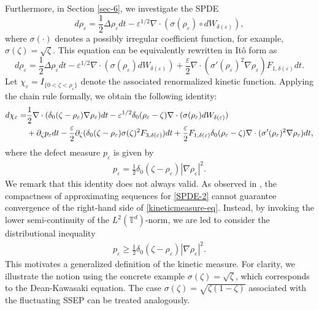 \documentclass[UTF-8,reqno]{amsart}
\numberwithin{equation}{section}
\def\geq{\geqslant}
\def\geq{\geqslant}
\begin{document}
Furthermore, in Section \ref{sec-6}, we investigate the SPDE 
\begin{equation}\label{SPDE-2}
d\rho_{\varepsilon}=\frac{1}{2}\Delta\rho_{\varepsilon}dt-\varepsilon^{1/2}\nabla\cdot(\sigma(\rho_{\varepsilon})\circ dW_{\delta(\varepsilon)}), 	
\end{equation}
where $\sigma(\cdot)$ denotes a possibly irregular coefficient function, for example, $\sigma(\zeta)=\sqrt{\zeta}$. This equation can be equivalently rewritten in It\^o form as
\begin{equation}\label{SPDE-irregular}
d\rho_{\varepsilon}=\frac{1}{2}\Delta\rho_{\varepsilon}dt-\varepsilon^{1/2}\nabla\cdot(\sigma(\rho_{\varepsilon}) dW_{\delta(\varepsilon)})+\frac{\varepsilon}{2}\nabla\cdot(\sigma'(\rho_{\varepsilon})^2\nabla\rho_{\varepsilon})F_{1,\delta(\varepsilon)}dt. 	
\end{equation}
Let $\chi_{\varepsilon}=I_{\{0<\zeta<\rho_{\varepsilon}\}}$ denote the associated renormalized kinetic function. Applying the chain rule formally, we obtain the following identity:
\begin{align}\label{kinetic-formula}
d\chi_{\varepsilon}=&\frac{1}{2}\nabla\cdot(\delta_0(\zeta-\rho_{\varepsilon})\nabla\rho_{\varepsilon})dt-\varepsilon^{1/2}\delta_0(\rho_{\varepsilon}-\zeta)\nabla\cdot(\sigma(\rho_{\varepsilon})dW_{\delta(\varepsilon)})\notag\\
&+\partial_{\zeta}p_{\varepsilon}dt-\frac{\varepsilon}{2}\partial_{\zeta}(\delta_0(\zeta-\rho_{\varepsilon})\sigma(\zeta)^2F_{3,\delta(\varepsilon)})dt+\frac{\varepsilon}{2}F_{1,\delta(\varepsilon)}\delta_0(\rho_{\varepsilon}-\zeta)\nabla\cdot(\sigma'(\rho_{\varepsilon})^2\nabla\rho_{\varepsilon})dt, 	
\end{align}
where the defect measure $p_{\varepsilon}$ is given by
\begin{align}\label{kineticmeasure-eq}
p_{\varepsilon}=\frac{1}{2}\delta_0(\zeta-\rho_{\varepsilon})|\nabla\rho_{\varepsilon}|^2.  	
\end{align}
We remark that this identity does not always valid. As observed in \cite{FG24}, the compactness of approximating sequences for \eqref{SPDE-2} cannot guarantee convergence of the right-hand side of \eqref{kineticmeasure-eq}. Instead, by invoking the lower semi-continuity of the $L^2(\mathbb{T}^d)$-norm, we are led to consider the distributional inequality
\begin{align}\label{kineticmeasure-ineq}
p_{\varepsilon}\geq\frac{1}{2}\delta_0(\zeta-\rho_{\varepsilon})|\nabla\rho_{\varepsilon}|^2.    	
\end{align}
This motivates a generalized definition of the kinetic measure. For clarity, we illustrate the notion using the concrete example $\sigma(\zeta)=\sqrt{\zeta}$, which corresponds to the Dean-Kawasaki equation. The case $\sigma(\zeta)=\sqrt{\zeta(1-\zeta)}$ associated with the fluctuating SSEP can be treated analogously.
\end{document}
